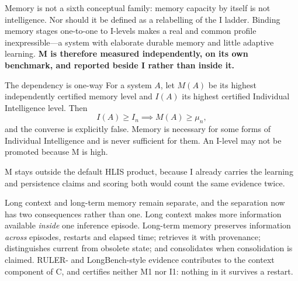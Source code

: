Memory is not a sixth conceptual family: memory capacity by itself is not intelligence. Nor should it be defined as a relabelling of the I ladder. Binding memory stages one-to-one to I-levels makes a real and common profile inexpressible---a system with elaborate durable memory and little adaptive learning. \textbf{M is therefore measured independently, on its own benchmark, and reported beside I rather than inside it.}

\begin{claimbox}{The dependency is one-way}
For a system $A$, let $M(A)$ be its highest independently certified memory level and $I(A)$ its highest certified Individual Intelligence level. Then
\[ I(A) \ge I_n \implies M(A) \ge \mu_n, \]
and the converse is explicitly false. Memory is necessary for some forms of Individual Intelligence and is never sufficient for them. An I-level may not be promoted because M is high.

M stays outside the default HLIS product, because I already carries the learning and persistence claims and scoring both would count the same evidence twice.
\end{claimbox}

Long context and long-term memory remain separate, and the separation now has two consequences rather than one. Long context makes more information available \emph{inside} one inference episode. Long-term memory preserves information \emph{across} episodes, restarts and elapsed time; retrieves it with provenance; distinguishes current from obsolete state; and consolidates when consolidation is claimed. RULER- and LongBench-style evidence contributes to the context component of C, and certifies neither M1 nor I1: nothing in it survives a restart.

